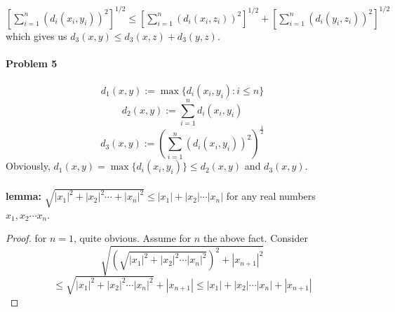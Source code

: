 \documentclass[../Main.tex]{subfiles}
\begin{document}
$[\sum_{i=1}^n(d_i(x_i,y_i))^2]^{1/2}\leq [\sum_{i=1}^n (d_i(x_i,z_i))^2]^{1/2}+[\sum_{i=1}^n (d_i(y_i,z_i))^2]^{1/2}$ which gives us $d_3(x,y)\leq d_3(x,z)+d_3(y,z)$. 
\\\\ \textbf{Problem 5}
\\\\ $$d_1(x,y):=\max\{d_i(x_i,y_i):i\leq n\} $$
$$d_2(x,y):=\sum_{i=1}^n d_i(x_i,y_i) $$
$$d_3(x,y):=(\sum_{i=1}^n (d_i(x_i,y_i))^2)^{\frac{1}{2}} $$
Obviously, $d_1(x,y)=\max\{d_i(x_i,y_i)\}\leq d_2(x,y)$ and $d_3(x,y)$. 
\\\\ \textbf{lemma:} $\sqrt{|x_1|^2+|x_2|^2 \cdots +|x_n|^2} \leq |x_1|+|x_2| \cdots |x_n|$ for any real numbers $x_1,x_2 \cdots x_n$.
\begin{proof}
    for $n=1$, quite obvious. Assume for $n$ the above fact. Consider $$\sqrt{(\sqrt{|x_1|^2+|x_2|^2 \cdots |x_n|^2})^2 +|x_{n+1}|^2}$$ $$\leq \sqrt{|x_1|^2+|x_2|^2 \cdots |x_n|^2}+|x_{n+1}| \leq |x_1|+|x_2| \cdots |x_n|+|x_{n+1}|$$

\end{proof} 
\end{document}

